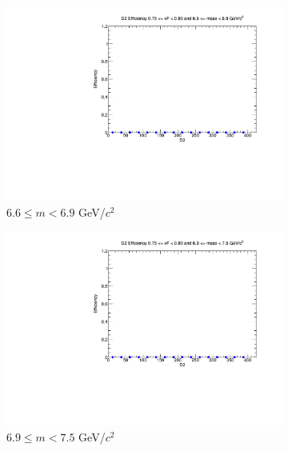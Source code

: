 \documentclass[11pt]{article}
\begin{document}
\begin{figure}[p]
\begin{subfigure}[b]{0.32\textwidth}
        \includegraphics[width=\textwidth]{./kTrackerEfficiencyPlots/D2_Efficiency_xF15_mass8.pdf}
        \caption{$6.6 \leq m < 6.9$ GeV/$c^2$}
    \end{subfigure}\vspace{0.5cm}
    \begin{subfigure}[b]{0.32\textwidth}
        \centering
        \includegraphics[width=\textwidth]{./kTrackerEfficiencyPlots/D2_Efficiency_xF15_mass9.pdf}
        \caption{$6.9 \leq m < 7.5$ GeV/$c^2$}
    \end{subfigure}\hfill
    \begin{subfigure}[b]{0.32\textwidth}
        \centering

\end{subfigure}
\end{figure}
\end{document}
